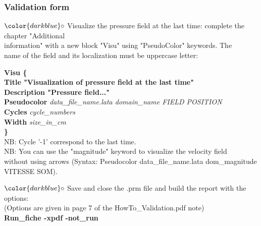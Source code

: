 \documentclass[10pt, hyperref={unicode=true,pdfusetitle, bookmarks=true,bookmarksnumbered=false,bookmarksopen=false, breaklinks=false,pdfborder={0 0 1},backref=true,colorlinks=true,linkcolor=darkblue,pageanchor}]{beamer}
\begin{document}
\begin{frame}
\frametitle{Validation form}
\begin{block}{}

\hspace{1cm} $\color{darkblue}\circ$ {\small{Visualize the pressure field at the last time: complete the chapter "Additional \\
\hspace{1.3cm} information" with a new block "Visu" using "PseudoColor" keywords. The \\
\hspace{1.3cm} name of the field and its localization must be uppercase letter: }}

{\footnotesize{
\hspace{1.3cm} \textbf{Visu \{ } \\
\hspace{1.6cm} \textbf{Title "Visualization of pressure field at the last time" } \\
\hspace{1.6cm} \textbf{Description "Pressure field..."} \\
\hspace{1.6cm} \textbf{Pseudocolor} \textit{data\_file\_name.lata domain\_name FIELD POSITION} \\
\hspace{1.6cm} \textbf{Cycles}  \textit{cycle\_numbers}\\
\hspace{1.6cm} \textbf{Width} \textit{size\_in\_cm} \\
\hspace{1.3cm} \textbf{\}} \\
}}
{\small{
\hspace{1.3cm} NB: Cycle '-1' correspond to the last time. \\
\hspace{1.3cm} NB: You can use the "magnitude" keyword to visualize the velocity field \\
\hspace{1.3cm} without using arrows (\small{Syntax: Pseudocolor data\_file\_name.lata dom\_magnitude VITESSE SOM}).
}}
\vspace{0.2cm}

\hspace{1cm} $\color{darkblue}\circ$ {\small{ Save and close the .prm file and build the report with the options:\\
\hspace{1.3cm} (Options are given in page 7 of the HowTo\_Validation.pdf note) }}\\
\hspace{1.3cm} {\small{\textbf{Run\_fiche -xpdf -not\_run}}}

\end{block}
\end{frame}
\end{document}
